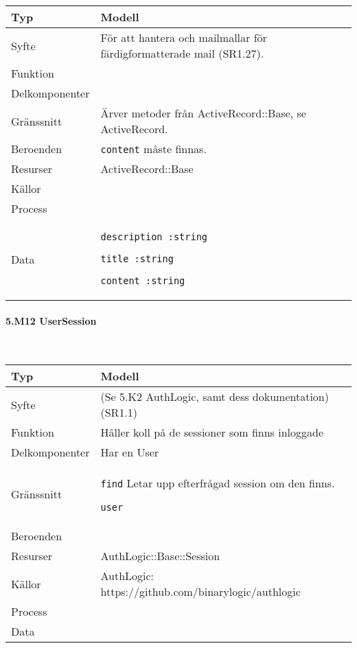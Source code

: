 \documentclass[a4paper, twoside, 11pt, titlepage]{article}
\begin{document}
			\begin {table} [ht] \begin{tabular} {  p{3.5cm} p{9.6cm} }
				\hline
				{Typ} & {Modell} \\
				\hline
				{Syfte} & {För att hantera och mailmallar för färdigformatterade mail (SR1.27).} \\
				\hline
				{Funktion} & { } \\
				\hline
				{Delkomponenter} & { } \\
				\hline
				{Gränssnitt} & {Ärver metoder från ActiveRecord::Base, se ActiveRecord.} \\
				\hline
				{Beroenden} & {{\tt content} måste finnas.} \\
				\hline
				{Resurser} & {ActiveRecord::Base} \\
				\hline
				{Källor} & { } \\
				\hline
				{Process} & { } \\
				\hline
				{Data} & {{\tt description :string}

{\tt title :string}

{\tt content :string}} \\
				\hline
			\end{tabular} \end{table} \FloatBarrier


			\paragraph{5.M12 UserSession}\

			\begin {table} [ht] \begin{tabular} {  p{3.5cm} p{9.6cm} }
				\hline
				{Typ} & {Modell} \\
				\hline
				{Syfte} & {(Se 5.K2 AuthLogic, samt dess dokumentation) (SR1.1)} \\
				\hline
				{Funktion} & {Håller koll på de sessioner som finns inloggade} \\
				\hline
				{Delkomponenter} & {Har en User} \\
				\hline
				{Gränssnitt} & {{\tt find} Letar upp efterfrågad session om den finns.

{\tt user} } \\
				\hline
				{Beroenden} & { } \\
				\hline
				{Resurser} & {AuthLogic::Base::Session} \\
				\hline
				{Källor} & {AuthLogic: https://github.com/binarylogic/authlogic} \\
				\hline
				{Process} & { } \\
				\hline
				{Data} & { } \\
				\hline
			\end{tabular} \end{table} \FloatBarrier
\end{document}
